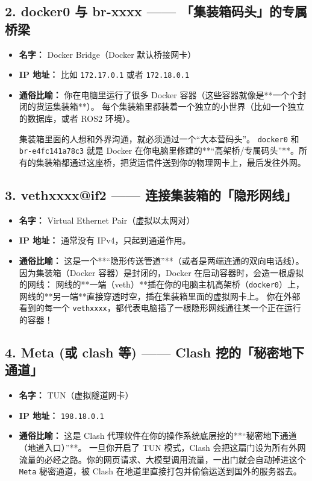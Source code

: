 \documentclass[12pt,a4paper]{ctexart}
\begin{document}
\subsection{2. docker0 与 br-xxxx —— 「集装箱码头」的专属桥梁}
\begin{itemize}
    \item \textbf{名字：} Docker Bridge（Docker 默认桥接网卡）
    \item \textbf{IP 地址：} 比如 \texttt{172.17.0.1} 或者 \texttt{172.18.0.1}
    \item \textbf{通俗比喻：} 你在电脑里运行了很多 Docker 容器（这些容器就像是**一个个封闭的货运集装箱**）。
    每个集装箱里都装着一个独立的小世界（比如一个独立的数据库，或者 ROS2 环境）。
    
    集装箱里面的人想和外界沟通，就必须通过一个“大本营码头”。
    \texttt{docker0} 和 \texttt{br-e4fc141a78c3} 就是 Docker 在你电脑里修建的**“高架桥/专属码头”**。所有的集装箱都通过这座桥，把货运信件送到你的物理网卡上，最后发往外网。
\end{itemize}

\subsection{3. vethxxxx@if2 —— 连接集装箱的「隐形网线」}
\begin{itemize}
    \item \textbf{名字：} Virtual Ethernet Pair（虚拟以太网对）
    \item \textbf{IP 地址：} 通常没有 IPv4，只起到通道作用。
    \item \textbf{通俗比喻：} 这是一个**“隐形传送管道”**（或者是两端连通的双向电话线）。
    因为集装箱（Docker 容器）是封闭的，Docker 在启动容器时，会造一根虚拟的网线：
    网线的**一端（veth）**插在你的电脑主机高架桥（\texttt{docker0}）上，网线的**另一端**直接穿透时空，插在集装箱里面的虚拟网卡上。
    你在外部看到的每一个 \texttt{vethxxxx}，都代表电脑插了一根隐形网线通往某一个正在运行的容器！
\end{itemize}

\subsection{4. Meta (或 clash 等) —— Clash 挖的「秘密地下通道」}
\begin{itemize}
    \item \textbf{名字：} TUN（虚拟隧道网卡）
    \item \textbf{IP 地址：} \texttt{198.18.0.1}
    \item \textbf{通俗比喻：} 这是 Clash 代理软件在你的操作系统底层挖的**“秘密地下通道（地道入口）”**。
    一旦你开启了 TUN 模式，Clash 会把这扇门设为所有外网流量的必经之路。你的网页请求、大模型调用流量，一出门就会自动掉进这个 \texttt{Meta} 秘密通道，被 Clash 在地道里直接打包并偷偷运送到国外的服务器去。
\end{itemize}
\end{document}
